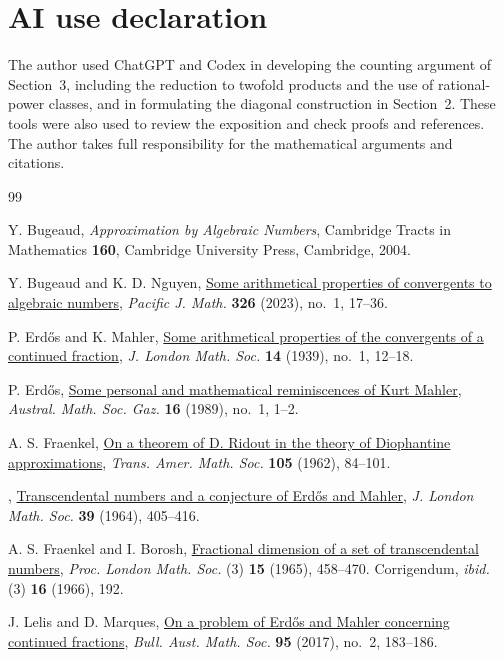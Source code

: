 \documentclass[11pt,reqno]{amsart}
\theoremstyle{definition}
\begin{document}
\section*{AI use declaration}

The author used ChatGPT and Codex in developing the counting
argument of Section~3, including the reduction to twofold
products and the use of rational-power classes, and in
formulating the diagonal construction in Section~2.
These tools were also used to review the exposition and
check proofs and references. The author takes full
responsibility for the mathematical arguments and citations.

\begin{thebibliography}{99}

Y. Bugeaud, \emph{Approximation by Algebraic Numbers}, Cambridge
Tracts in Mathematics \textbf{160}, Cambridge University Press,
Cambridge, 2004.

Y. Bugeaud and K. D. Nguyen,
\href{https://doi.org/10.2140/pjm.2023.326.17}{Some arithmetical
properties of convergents to algebraic numbers},
\emph{Pacific J. Math.} \textbf{326} (2023), no.~1, 17--36.

P. Erd\H{o}s and K. Mahler,
\href{https://doi.org/10.1112/jlms/s1-14.1.12}{Some arithmetical
properties of the convergents of a continued fraction},
\emph{J. London Math. Soc.} \textbf{14} (1939), no.~1, 12--18.

P. Erd\H{o}s,
\href{https://old.renyi.hu/~p_erdos/1989-34.pdf}
{Some personal and mathematical reminiscences
of Kurt Mahler},
\emph{Austral. Math. Soc. Gaz.}
\textbf{16} (1989), no.~1, 1--2.

A. S. Fraenkel,
\href{https://doi.org/10.1090/S0002-9947-1962-0144852-2}{On a
theorem of D. Ridout in the theory of Diophantine approximations},
\emph{Trans. Amer. Math. Soc.} \textbf{105} (1962), 84--101.

\bysame,
\href{https://doi.org/10.1112/jlms/s1-39.1.405}{Transcendental
numbers and a conjecture of Erd\H{o}s and Mahler},
\emph{J. London Math. Soc.} \textbf{39} (1964), 405--416.

A. S. Fraenkel and I. Borosh,
\href{https://doi.org/10.1112/plms/s3-15.1.458}{Fractional dimension
of a set of transcendental numbers}, \emph{Proc. London Math. Soc.}
(3) \textbf{15} (1965), 458--470. Corrigendum, \emph{ibid.}
(3) \textbf{16} (1966), 192.

J. Lelis and D. Marques,
\href{https://doi.org/10.1017/S0004972716000770}
{On a problem of Erd\H{o}s and Mahler concerning
continued fractions},
\emph{Bull. Aust. Math. Soc.}
\textbf{95} (2017), no.~2, 183--186.


\end{thebibliography}
\end{document}
